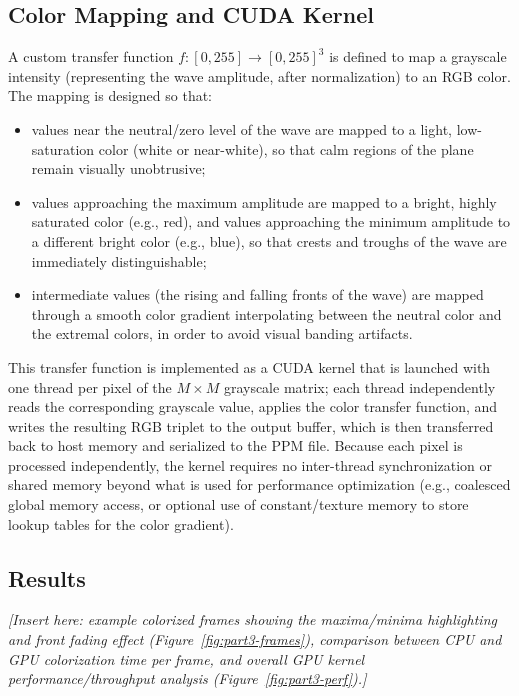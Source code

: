 \documentclass[10pt,twocolumn]{article}
\begin{document}
\subsection{Color Mapping and CUDA Kernel}
A custom transfer function $f: [0,255] \rightarrow [0,255]^3$ is defined to map a grayscale
intensity (representing the wave amplitude, after normalization) to an RGB color. The mapping
is designed so that:
\begin{itemize}
    \item values near the neutral/zero level of the wave are mapped to a light, low-saturation
    color (white or near-white), so that calm regions of the plane remain visually unobtrusive;
    \item values approaching the maximum amplitude are mapped to a bright, highly saturated
    color (e.g., red), and values approaching the minimum amplitude to a different bright color
    (e.g., blue), so that crests and troughs of the wave are immediately distinguishable;
    \item intermediate values (the rising and falling fronts of the wave) are mapped through a
    smooth color gradient interpolating between the neutral color and the extremal colors, in
    order to avoid visual banding artifacts.
\end{itemize}

This transfer function is implemented as a CUDA kernel that is launched with one thread per
pixel of the $M \times M$ grayscale matrix; each thread independently reads the corresponding
grayscale value, applies the color transfer function, and writes the resulting RGB triplet to
the output buffer, which is then transferred back to host memory and serialized to the PPM
file. Because each pixel is processed independently, the kernel requires no inter-thread
synchronization or shared memory beyond what is used for performance optimization (e.g.,
coalesced global memory access, or optional use of constant/texture memory to store
lookup tables for the color gradient).


\subsection{Results}
\textit{[Insert here: example colorized frames showing the maxima/minima highlighting and
front fading effect (Figure~\ref{fig:part3-frames}), comparison between CPU and GPU
colorization time per frame, and overall GPU kernel performance/throughput analysis
(Figure~\ref{fig:part3-perf}).]}
\end{document}
